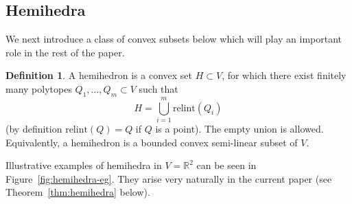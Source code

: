 \documentclass[10pt]{amsart}
\theoremstyle{plain}
\theoremstyle{definition}
\newtheorem{definition}[lemma]{Definition}
\providecommand{\relint}[1]{\ensuremath{\mathrm{relint}{\left({#1}\right)}\xspace}}
\begin{document}
\subsection{Hemihedra}
We next introduce a class of convex subsets below which will play an important role in the rest of the paper.
\begin{definition}
\label{def:hemihedra}
A hemihedron is a convex set $H \subset V$, for which there
exist finitely many polytopes $Q_1,\ldots,Q_m \subset V$ such that
\[
H = \bigcup_{i=1}^{m} \relint{Q_i}
\]
(by definition $\relint{Q} = Q$ if $Q$ is a point). 
The empty union is allowed.
Equivalently, a hemihedron is a bounded convex
semi-linear subset of $V$.
\end{definition}

Illustrative examples of hemihedra in $V=\mathbb{R}^2$ can be seen in Figure~\ref{fig:hemihedra-eg}.
They arise very naturally in the current paper (see Theorem~\ref{thm:hemihedra} below).
\end{document}
